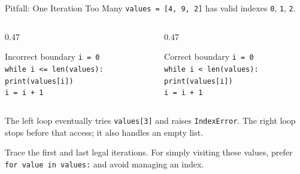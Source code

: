 \documentclass[aspectratio=169,10pt]{beamer}
\begin{document}
\begin{frame}[t]{Pitfall: One Iteration Too Many}
  \small
  \texttt{values = [4, 9, 2]} has valid indexes \texttt{0}, \texttt{1}, \texttt{2}.
  \begin{columns}[T,onlytextwidth]
    \begin{column}{0.47\textwidth}
      \begin{alertblock}{Incorrect boundary}
        \texttt{i = 0}\\
        \texttt{while i <= len(values):}\\
        \hspace{0.18in}\texttt{print(values[i])}\\
        \hspace{0.18in}\texttt{i = i + 1}
      \end{alertblock}
    \end{column}
    \begin{column}{0.47\textwidth}
      \begin{block}{Correct boundary}
        \texttt{i = 0}\\
        \texttt{while i < len(values):}\\
        \hspace{0.18in}\texttt{print(values[i])}\\
        \hspace{0.18in}\texttt{i = i + 1}
      \end{block}
    \end{column}
  \end{columns}
  The left loop eventually tries \texttt{values[3]} and raises \texttt{IndexError}. The right loop stops before that access; it also handles an empty list.
  \begin{keyidea}
    Trace the first and last legal iterations. For simply visiting these values, prefer \texttt{for value in values:} and avoid managing an index.
  \end{keyidea}
\end{frame}

\end{document}
